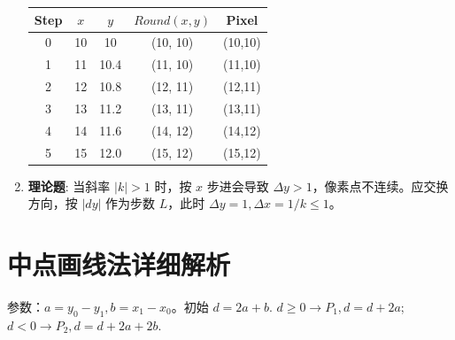 \documentclass[UTF8]{ctexart}
\begin{document}
\begin{enumerate}
    \begin{center}
    \begin{tabular}{ccccc}
    \toprule Step & $x$ & $y$ & $Round(x,y)$ & Pixel \\ \midrule
    0 & 10 & 10 & (10, 10) & (10,10) \\
    1 & 11 & 10.4 & (11, 10) & (11,10) \\ 2 & 12 & 10.8 & (12, 11) & (12,11) \\
    3 & 13 & 11.2 & (13, 11) & (13,11) \\ 4 & 14 & 11.6 & (14, 12) & (14,12) \\
    5 & 15 & 12.0 & (15, 12) & (15,12) \\ \bottomrule
    \end{tabular}
    \end{center}
    \item \textbf{理论题}: 当斜率 $|k| > 1$ 时，按 $x$ 步进会导致 $\Delta y > 1$，像素点不连续。应交换方向，按 $|dy|$ 作为步数 $L$，此时 $\Delta y = 1, \Delta x = 1/k \le 1$。
\end{enumerate}

\section{中点画线法详细解析}
参数：$a=y_0-y_1, b=x_1-x_0$。初始 $d = 2a+b$. $d \ge 0 \to P_1, d = d+2a$; $d < 0 \to P_2, d = d+2a+2b$.
\end{document}
